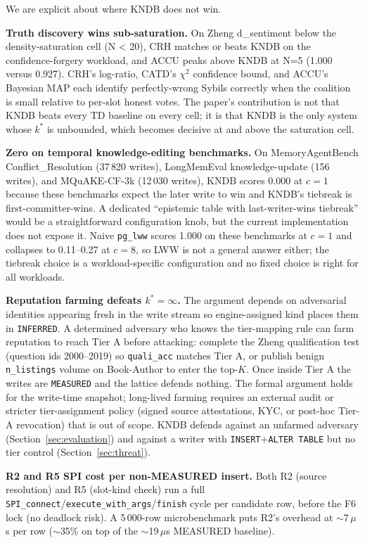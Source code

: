 \documentclass[sigconf, nonacm]{acmart}
\begin{document}
We are explicit about where KNDB does not win.

\textbf{Truth discovery wins sub-saturation.} On Zheng d\_sentiment below the density-saturation cell (N < 20), CRH matches or beats KNDB on the confidence-forgery workload, and ACCU peaks above KNDB at N=5 (1.000 versus 0.927). CRH's log-ratio, CATD's $\chi^{2}$ confidence bound, and ACCU's Bayesian MAP each identify perfectly-wrong Sybils correctly when the coalition is small relative to per-slot honest votes. The paper's contribution is not that KNDB beats every TD baseline on every cell; it is that KNDB is the only system whose $k^{*}$ is unbounded, which becomes decisive at and above the saturation cell.

\textbf{Zero on temporal knowledge-editing benchmarks.} On MemoryAgentBench Conflict\_Resolution (37\,820 writes), LongMemEval knowledge-update (156 writes), and MQuAKE-CF-3k (12\,030 writes), KNDB scores 0.000 at $c=1$ because these benchmarks expect the later write to win and KNDB's tiebreak is first-committer-wins. A dedicated ``epistemic table with last-writer-wins tiebreak'' would be a straightforward configuration knob, but the current implementation does not expose it. Naive \texttt{pg\_lww} scores 1.000 on these benchmarks at $c=1$ and collapses to 0.11--0.27 at $c=8$, so LWW is not a general answer either; the tiebreak choice is a workload-specific configuration and no fixed choice is right for all workloads.

\textbf{Reputation farming defeats $k^{*}=\infty$.} The argument depends on adversarial identities appearing fresh in the write stream so engine-assigned kind places them in \texttt{INFERRED}. A determined adversary who knows the tier-mapping rule can farm reputation to reach Tier A before attacking: complete the Zheng qualification test (question ids 2000--2019) so \texttt{quali\_acc} matches Tier A, or publish benign \texttt{n\_listings} volume on Book-Author to enter the top-$K$. Once inside Tier A the writes are \texttt{MEASURED} and the lattice defends nothing. The formal argument holds for the write-time snapshot; long-lived farming requires an external audit or stricter tier-assignment policy (signed source attestations, KYC, or post-hoc Tier-A revocation) that is out of scope. KNDB defends against an unfarmed adversary (Section~\ref{sec:evaluation}) and against a writer with \texttt{INSERT}+\texttt{ALTER TABLE} but no tier control (Section~\ref{sec:threat}).

\textbf{R2 and R5 SPI cost per non-MEASURED insert.} Both R2 (source resolution) and R5 (slot-kind check) run a full \texttt{SPI\_connect}/\texttt{execute\_with\_args}/\texttt{finish} cycle per candidate row, before the F6 lock (no deadlock risk). A 5\,000-row microbenchmark puts R2's overhead at $\sim$7\,$\mu$s per row ($\sim$35\% on top of the $\sim$19\,$\mu$s MEASURED baseline).
\end{document}
